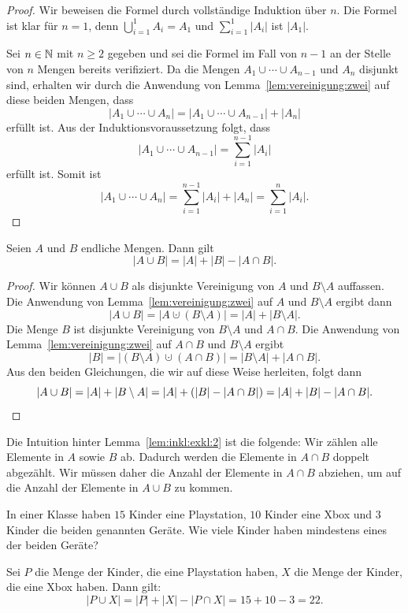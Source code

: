 \begin{proof} 
	Wir beweisen die Formel durch vollständige Induktion über $n$. 
	Die Formel ist klar für $n=1$, denn $\bigcup_{i=1}^1 A_i = A_1$ und $\sum_{i=1}^1 |A_i|$ ist $|A_1|$.
	
	Sei $n \in \mathbb{N}$ mit $n \ge 2$ gegeben und sei die Formel im Fall von $n-1$ an der Stelle von $n$ Mengen bereits verifiziert. Da die Mengen $A_1 \cup \cdots \cup A_{n-1}$ und $A_n$ disjunkt sind, erhalten wir durch die Anwendung von Lemma~\ref{lem:vereinigung:zwei} auf diese beiden Mengen, dass 
	\[
		| A_1 \cup \cdots \cup A_n| = |A_1 \cup \cdots \cup A_{n-1} | + |A_n| 
	\]
	erfüllt ist. Aus der Induktionsvoraussetzung folgt, dass 
	\[
		| A_1 \cup \cdots \cup A_{n-1} | = \sum_{i=1}^{n-1} |A_i|
	\]
	erfüllt ist. Somit ist 
	\[
		| A_1 \cup \cdots \cup A_n| = \sum_{i=1}^{n-1} |A_i|  + |A_n| = \sum_{i=1}^n |A_i|. 
	\]
\end{proof} 

\begin{lem}
\label{lem:inkl:exkl:2}
	Seien $A$ und $B$ endliche Mengen. Dann gilt 
	\[
		|A \cup B| = |A| + |B| - |A \cap B|. 
	\]
\end{lem}

\begin{proof}
		Wir können $A \cup B$ als disjunkte Vereinigung von $A$ und $B \setminus A$ auffassen. Die Anwendung von Lemma~\ref{lem:vereinigung:zwei} auf $A$ und $B \setminus A$ ergibt dann
		\[
			| A \cup B| = |A \cupdot (B \setminus A)| = |A | + |B \setminus A|. 
		\]
		Die Menge $B$ ist disjunkte Vereinigung von $B \setminus A$ und $A \cap B$. Die Anwendung von Lemma~\ref{lem:vereinigung:zwei} auf $A \cap B$ und $B \setminus A$ ergibt
		\[
			|B| = |(B \setminus A) \cupdot (A \cap B)| = |B \setminus A| + |A \cap B|. 
		\]
		Aus den beiden Gleichungen, die wir auf diese Weise herleiten, folgt dann 
		\[
			| A \cup B|  = |A | + |B \setminus A| = |A| + (|B| - | A \cap B|) = |A| + |B| - | A \cap B|.\qedhere
		\]
\end{proof} 

\begin{bem}
	Die Intuition hinter Lemma~\ref{lem:inkl:exkl:2} ist die folgende: Wir zählen alle Elemente in $A$ sowie $B$ ab. Dadurch werden die Elemente in $A \cap B$ doppelt abgezählt. Wir müssen daher die Anzahl der Elemente in $A \cap B$ abziehen, um auf die Anzahl der Elemente in $A \cup B$ zu kommen. 
\end{bem} 


\begin{bsp}
	In einer Klasse haben $15$ Kinder eine Playstation, $10$ Kinder eine Xbox und $3$ Kinder die beiden genannten Geräte. Wie viele Kinder haben mindestens eines der beiden Geräte? 
	
	Sei $P$ die Menge der Kinder, die eine Playstation haben, $X$ die Menge der Kinder, die eine Xbox haben. Dann gilt: 
	\[
		|P \cup X| = |P| + |X| - |P \cap X| = 15 + 10 - 3 = 22. 
	\]
\end{bsp} 


